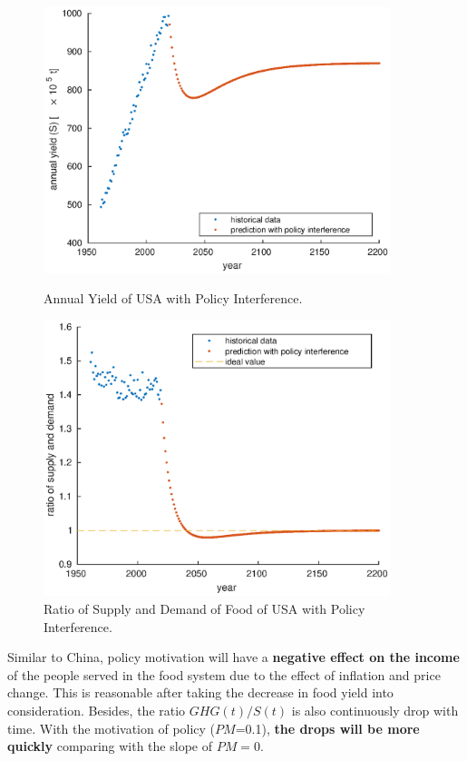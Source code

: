 \documentclass[12pt]{article}
\begin{document}
\begin{figure}[htbp]
    \centering
    \begin{minipage}[t]{0.48\textwidth}
        \centering
        \includegraphics[width=0.9\textwidth]{figure/model/USA/USA_yield.eps}
        \caption{Annual Yield of USA with Policy Interference.\label{fig:USA_yield}}
    \end{minipage}
    \begin{minipage}[t]{0.48\textwidth}
        \centering
        \includegraphics[width=0.9\textwidth]{figure/model/USA/USA_equity.eps}
        \caption{Ratio of Supply and Demand of Food of USA with Policy Interference.\label{fig:USA_equity}}
    \end{minipage}
\end{figure}

Similar to China, policy motivation will have a \textbf{negative effect on the income} of the people served in the food system due to the effect of inflation and price change. This is reasonable after taking the decrease in food yield into consideration. Besides, the ratio $GHG(t)/S(t)$ is also continuously drop with time. With the motivation of policy ($PM$=0.1), \textbf{the drops will be more quickly} comparing with the slope of $PM=0$.
\end{document}
